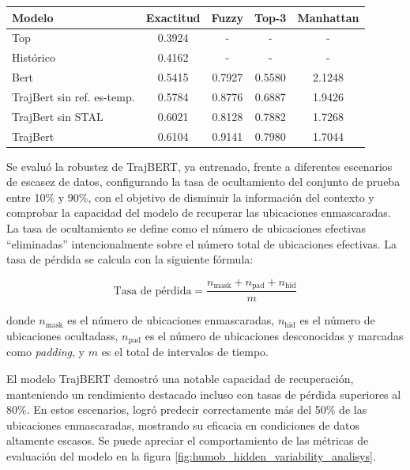 \begin{table}[ht]
\centering
\begin{tabular}{|l|c|c|c|c|}
\hline
\textbf{Modelo}             & \textbf{Exactitud} & \textbf{Fuzzy} & \textbf{Top-3} &  \textbf{Manhattan} \\ \hline
Top                         & 0.3924             & -              & -              & -                   \\ \hline
Histórico                   & 0.4162             & -              & -              & -                   \\ \hline
Bert                        & 0.5415             & 0.7927         & 0.5580         & 2.1248              \\ \hline
TrajBert sin ref. es-temp.  & 0.5784             & 0.8776         & 0.6887         & 1.9426              \\ \hline
TrajBert sin STAL           & 0.6021             & 0.8128         & 0.7882         & 1.7268              \\ \hline
TrajBert                    & 0.6104             & 0.9141         & 0.7980         & 1.7044              \\ \hline
\end{tabular}
\label{tab:model_comparison}
\end{table}

Se evaluó la robustez de TrajBERT, ya entrenado, frente a diferentes escenarios de escasez de datos, configurando la tasa de ocultamiento del conjunto de prueba entre 10\% y 90\%, con el objetivo de disminuir la información del contexto y comprobar la capacidad del modelo de recuperar las ubicaciones enmascaradas. La tasa de ocultamiento se define como el número de ubicaciones efectivas ``eliminadas'' intencionalmente sobre el número total de ubicaciones efectivas. La tasa de pérdida se calcula con la siguiente fórmula:

\begin{equation}
\text{Tasa de pérdida} = \frac{n_{\text{mask}} + n_{\text{pad}} + n_{\text{hid}}}{m}
\end{equation}

\noindent
donde $n_{\text{mask}}$ es el número de ubicaciones enmascaradas, $n_{\text{hid}}$ es el número de ubicaciones ocultadass, $n_{\text{pad}}$ es el número de ubicaciones desconocidas y marcadas como \textit{padding}, y $m$ es el total de intervalos de tiempo.

El modelo TrajBERT demostró una notable capacidad de recuperación, manteniendo un rendimiento destacado incluso con tasas de pérdida superiores al 80\%. En estos escenarios, logró predecir correctamente más del 50\% de las ubicaciones enmascaradas, mostrando su eficacia en condiciones de datos altamente escasos. Se puede apreciar el comportamiento de las métricas de evaluación del modelo en la figura \ref{fig:humob_hidden_variability_analisys}. 

